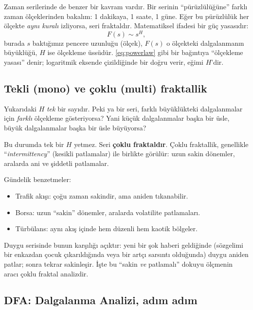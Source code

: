 \documentclass[11pt,a4paper]{article}
\begin{document}
Zaman serilerinde de benzer bir kavram vardır. Bir serinin ``pürüzlülüğüne''
farklı zaman ölçeklerinden bakalım: 1 dakikaya, 1 saate, 1 güne. Eğer bu
pürüzlülük her ölçekte \emph{aynı kuralı} izliyorsa, seri fraktaldır. Matematiksel
ifadesi bir güç yasasıdır:
\begin{equation}
  F(s) \sim s^{H},
  \label{eq:powerlaw}
\end{equation}
burada $s$ baktığımız pencere uzunluğu (ölçek), $F(s)$ o ölçekteki
dalgalanmanın büyüklüğü, $H$ ise ölçekleme üssüdür. \eqref{eq:powerlaw} gibi
bir bağıntıya ``ölçekleme yasası'' denir; logaritmik eksende çizildiğinde
bir doğru verir, eğimi $H$'dir.

\subsection{Tekli (mono) ve çoklu (multi) fraktallik}

Yukarıdaki $H$ \emph{tek} bir sayıdır. Peki ya bir seri, farklı büyüklükteki
dalgalanmalar için \emph{farklı} ölçekleme gösteriyorsa? Yani küçük
dalgalanmalar başka bir üsle, büyük dalgalanmalar başka bir üsle büyüyorsa?

Bu durumda tek bir $H$ yetmez. Seri \textbf{çoklu fraktaldır}. Çoklu
fraktallik, genellikle ``\emph{intermittency}'' (kesikli patlamalar) ile
birlikte görülür: uzun sakin dönemler, aralarda ani ve şiddetli patlamalar.

Gündelik benzetmeler:
\begin{itemize}[leftmargin=1.4em]
  \item Trafik akışı: çoğu zaman sakindir, ama aniden tıkanabilir.
  \item Borsa: uzun ``sakin'' dönemler, aralarda volatilite patlamaları.
  \item Türbülans: aynı akış içinde hem düzenli hem kaotik bölgeler.
\end{itemize}

Duygu serisinde bunun karşılığı açıktır: yeni bir şok haberi geldiğinde
(sözgelimi bir enkazdan çocuk çıkarıldığında veya bir artçı sarsıntı olduğunda)
duygu aniden patlar; sonra tekrar sakinleşir. İşte bu ``sakin \emph{ve}
patlamalı'' dokuyu ölçmenin aracı çoklu fraktal analizdir.

\subsection{DFA: Dalgalanma Analizi, adım adım}
\end{document}
